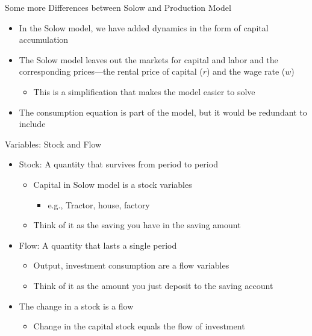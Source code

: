\documentclass[aspectratio=1610]{beamer}
\begin{document}
\begin{frame}[wide]{Some more Differences between Solow and Production Model}
	\begin{itemize}
		\item In the Solow model, we have added dynamics in the form of capital accumulation
		\vspace{3mm}
		\item The Solow model leaves out the markets for capital and labor and the corresponding prices—the rental price of capital ($r$) and the wage rate ($w$)
		\vspace{1mm}
		\begin{itemize}
			\item This is a simplification that makes the model easier to solve
		\end{itemize}
		\vspace{3mm}
		\item The consumption equation is part of the model, but it would be redundant to include
	\end{itemize}
\end{frame}

\begin{frame}[wide]{Variables: Stock and Flow}
	\begin{itemize}
		\item Stock: A quantity that survives from period to period
		\begin{itemize}
			\item Capital in Solow model is a stock variables
			\begin{itemize}
				\item e.g., Tractor, house, factory
			\end{itemize}
			\item Think of it as the saving you have in the saving amount
		\vspace{3mm}
		\end{itemize}
		\item Flow: A quantity that lasts a single period
		\begin{itemize}
			\item Output, investment consumption are a flow variables
			\item Think of it as the amount you just deposit to the saving account
		\end{itemize}
		\vspace{3mm}
		\item The change in a stock is a flow
		\begin{itemize}
			\item Change in the capital stock equals the flow of investment
		\end{itemize}
	\end{itemize}
\end{frame}
\end{document}
